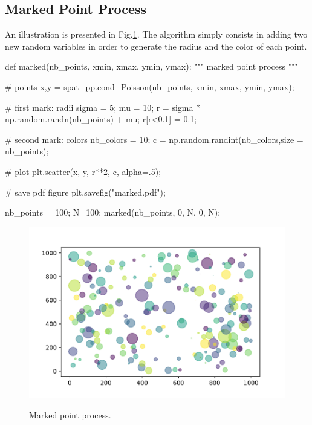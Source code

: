 \subsection{Marked Point Process}
An illustration is presented in Fig.\ref{fig:point_process_generation:python:marked}. The algorithm simply consists in adding two new random variables in order to generate the radius and the color of each point.

\begin{python}
def marked(nb_points, xmin, xmax, ymin, ymax):
    """
    marked point process
    """
    
    # points
    x,y = spat_pp.cond_Poisson(nb_points, xmin, xmax, ymin, ymax);
    
    # first mark: radii
    sigma = 5;
    mu = 10;
    r = sigma * np.random.randn(nb_points) + mu;
    r[r<0.1] = 0.1;
    
    # second mark: colors
    nb_colors = 10;
    c = np.random.randint(nb_colors,size = nb_points);
    
    # plot
    plt.scatter(x, y, r**2, c, alpha=.5);
	 
	 # save pdf figure
	 plt.savefig("marked.pdf");
    
nb_points = 100;
N=100;
marked(nb_points, 0, N, 0, N);
\end{python}

\begin{figure}[H]
 \centering\caption{Marked point process.}%
 \includegraphics[width=.8\linewidth]{marked.pdf}%
 \label{fig:point_process_generation:python:marked}%
\end{figure}

